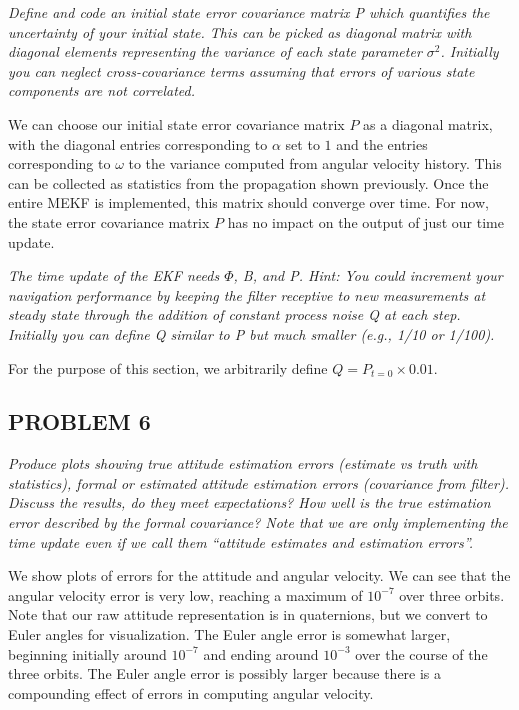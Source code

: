 \textit{Define and code an initial state error covariance matrix P which quantifies the uncertainty of your initial state. This can be picked as diagonal matrix with diagonal elements representing the variance of each state parameter $\sigma^{2}$. Initially you can neglect cross-covariance terms assuming that errors of various state components are not correlated.}

We can choose our initial state error covariance matrix $P$ as a diagonal matrix, with the diagonal entries corresponding to $\alpha$ set to $1$ and the entries corresponding to $\omega$ to the variance computed from angular velocity history. This can be collected as statistics from the propagation shown previously. Once the entire MEKF is implemented, this matrix should converge over time. For now, the state error covariance matrix $P$ has no impact on the output of just our time update.

\textit{The time update of the EKF needs $\Phi$, B, and P. Hint: You could increment your navigation performance by keeping the filter receptive to new measurements at steady state through the addition of constant process noise Q at each step. Initially you can define Q similar to P but much smaller (e.g., 1/10 or 1/100).}

For the purpose of this section, we arbitrarily define $Q = P_{t=0} \times 0.01$.

\subsection{PROBLEM 6}
\textit{Produce plots showing true attitude estimation errors (estimate vs truth with statistics), formal or estimated attitude estimation errors (covariance from filter). Discuss the results, do they meet expectations? How well is the true estimation error described by the formal covariance? Note that we are only implementing the time update even if we call them “attitude estimates and estimation errors”.}

We show plots of errors for the attitude and angular velocity. We can see that the angular velocity error is very low, reaching a maximum of $10^{-7}$ over three orbits. Note that our raw attitude representation is in quaternions, but we convert to Euler angles for visualization. The Euler angle error is somewhat larger, beginning initially around $10^{-7}$ and ending around $10^{-3}$ over the course of the three orbits. The Euler angle error is possibly larger because there is a compounding effect of errors in computing angular velocity.

